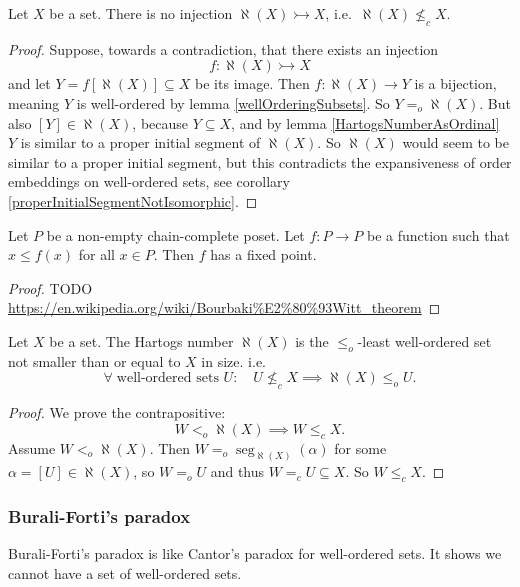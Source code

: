 \begin{theorem} \label{HartogsLemma}
Let $X$ be a set. There is no injection $\aleph(X) \rightarrowtail X$, i.e.\ $\aleph(X) \nleq_c X$.
\end{theorem}
\begin{proof}
Suppose, towards a contradiction, that there exists an injection
\[ f: \aleph(X) \rightarrowtail X \]
and let $Y = f[\aleph(X)] \subseteq X$ be its image. Then $f: \aleph(X) \to Y$ is a bijection, meaning $Y$ is well-ordered by lemma \ref{wellOrderingSubsets}. So $Y =_o \aleph(X)$.
But also $[Y]\in \aleph(X)$, because $Y\subseteq X$, and by lemma \ref{HartogsNumberAsOrdinal} $Y$ is similar to a proper initial segment of $\aleph(X)$.
So $\aleph(X)$ would seem to be similar to a proper initial segment, but this contradicts the expansiveness of order embeddings on well-ordered sets, see corollary \ref{properInitialSegmentNotIsomorphic}.
\end{proof}

\begin{proposition} \label{BourbakiWitt}
Let $P$ be a non-empty chain-complete poset. Let $f: P \to P$ be a function such that $x\leq f(x)$ for all $x\in P$. Then $f$ has a fixed point.
\end{proposition}
\begin{proof}
TODO \url{https://en.wikipedia.org/wiki/Bourbaki%E2%80%93Witt_theorem}
\end{proof}


\begin{proposition} \label{proposition:HartogsLeast}
Let $X$ be a set. The Hartogs number $\aleph(X)$ is the $\leq_o$-least well-ordered set not smaller than or equal to $X$ in size. i.e.\
\[ \forall \;\text{well-ordered sets $U$}:\quad U \nleq_c X \implies \aleph(X)\leq_o U. \]
\end{proposition}
\begin{proof}
We prove the contrapositive:
\[ W <_o \aleph(X) \implies W \leq_c X. \]
Assume $W <_o \aleph(X)$. Then $W =_o \operatorname{seg}_{\aleph(X)}(\alpha)$ for some $\alpha = [U]\in \aleph(X)$, so $W=_o U$ and thus $W =_c U \subseteq X$. So $W\leq_c X$.
\end{proof}

\subsubsection{Burali-Forti's paradox}
Burali-Forti's paradox is like Cantor's paradox for well-ordered sets. It shows we cannot have a set of well-ordered sets.

